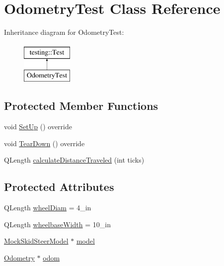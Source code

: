 \hypertarget{classOdometryTest}{}\section{Odometry\+Test Class Reference}
\label{classOdometryTest}
Inheritance diagram for Odometry\+Test\+:\begin{figure}[H]
\begin{center}
\leavevmode
\includegraphics[height=2.000000cm]{classOdometryTest}
\end{center}
\end{figure}
\subsection*{Protected Member Functions}
\begin{DoxyCompactItemize}
\item 
void \mbox{\hyperlink{classOdometryTest_a98fe68df1d22879a54cd343a01aaddf7}{Set\+Up}} () override
\item 
void \mbox{\hyperlink{classOdometryTest_ab6bf7a06f46258b5953e59c2d813b243}{Tear\+Down}} () override
\item 
Q\+Length \mbox{\hyperlink{classOdometryTest_afe7cb87c86a26db83f95b6a416a18510}{calculate\+Distance\+Traveled}} (int ticks)
\end{DoxyCompactItemize}
\subsection*{Protected Attributes}
\begin{DoxyCompactItemize}
\item 
Q\+Length \mbox{\hyperlink{classOdometryTest_a9f50ce54ff057f2dc7d573a7de22e3d2}{wheel\+Diam}} = 4\+\_\+in
\item 
Q\+Length \mbox{\hyperlink{classOdometryTest_a46d630ba4303e69822aee734c92b587a}{wheelbase\+Width}} = 10\+\_\+in
\item 
\mbox{\hyperlink{classokapi_1_1MockSkidSteerModel}{Mock\+Skid\+Steer\+Model}} $\ast$ \mbox{\hyperlink{classOdometryTest_a4cdbfcbfdf2a70f6bbb39c652596250b}{model}}
\item 
\mbox{\hyperlink{classokapi_1_1Odometry}{Odometry}} $\ast$ \mbox{\hyperlink{classOdometryTest_ab00eb120bd549552ab5eb2d211142980}{odom}}
\end{DoxyCompactItemize}
